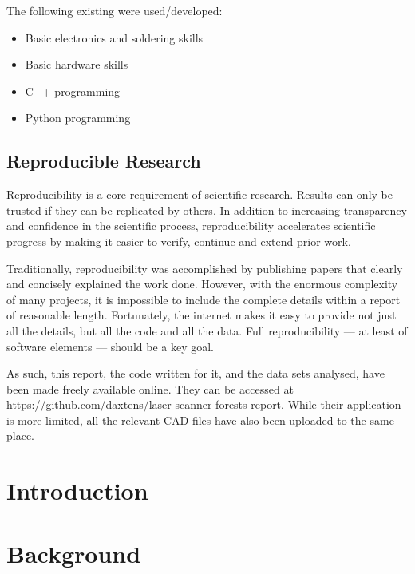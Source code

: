 \documentclass[12pt,oneside,a4paper]{book}
\begin{document}
The following existing were used/developed:
\begin{itemize}
\item Basic electronics and soldering skills
\item Basic hardware skills
\item C++ programming
\item Python programming
\end{itemize}

\section{Reproducible Research}
\label{sec:repr-rese}

Reproducibility is a core requirement of scientific research. Results
can only be trusted if they can be replicated by others. In addition
to increasing transparency and confidence in the scientific process,
reproducibility accelerates scientific progress by making it easier to
verify, continue and extend prior work.

Traditionally, reproducibility was accomplished by publishing papers
that clearly and concisely explained the work done. However, with the
enormous complexity of many projects, it is impossible to include the
complete details within a report of reasonable length. Fortunately,
the internet makes it easy to provide not just all the details, but
all the code and all the data. Full reproducibility --- at least of
software elements --- should be a key goal.

As such, this report, the code written for it, and the data sets
analysed, have been made freely available online. They can be accessed
at \url{https://github.com/daxtens/laser-scanner-forests-report}.
While their application is more limited, all the relevant CAD files
have also been uploaded to the same place.



\chapter{Introduction}
\label{cha:intro}

\chapter{Background}
\label{cha:background}

\end{document}
